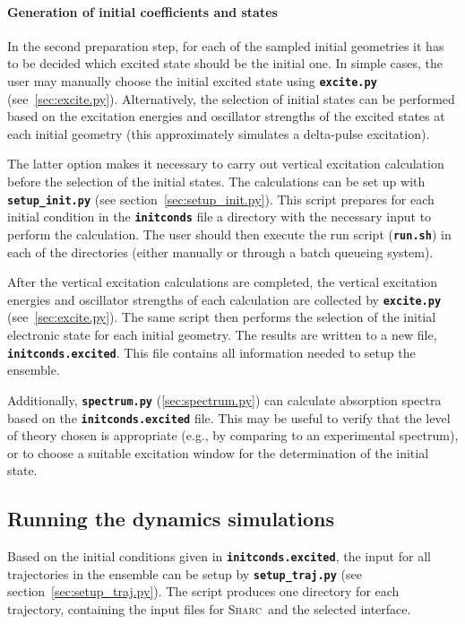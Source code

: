 \documentclass[a4paper,11pt,DIV=15,openany,twoside=false]{scrbook}
\newcommand{\sharc}{\textsc{Sharc}}
\newcommand{\ttt}[1]{\textbf{\texttt{#1}}}
\begin{document}
\paragraph{Generation of initial coefficients and states}

In the second preparation step, for each of the sampled initial geometries it has to be decided which excited state should be the initial one. In simple cases, the user may manually choose the initial excited state using \ttt{excite.py} (see~\ref{sec:excite.py}). Alternatively, the selection of initial states can be performed based on the excitation energies and oscillator strengths of the excited states at each initial geometry (this approximately simulates a delta-pulse excitation). 

The latter option makes it necessary to carry out vertical excitation calculation before the selection of the initial states.
The calculations can be set up with \ttt{setup\_init.py} (see section~\ref{sec:setup_init.py}). This script prepares for each initial condition in the \ttt{initconds} file a directory with the necessary input to perform the calculation. The user should then execute the run script (\ttt{run.sh}) in each of the directories (either manually or through a batch queueing system).

After the vertical excitation calculations are completed, the vertical excitation energies and oscillator strengths of each calculation are collected by \ttt{excite.py} (see~\ref{sec:excite.py}). The same script then performs the selection of the initial electronic state for each initial geometry. The results are written to a new file, \ttt{initconds.excited}. This file contains all information needed to setup the ensemble. 

Additionally, \ttt{spectrum.py} (\ref{sec:spectrum.py}) can calculate absorption spectra based on the \ttt{initconds.excited} file. This may be useful to verify that the level of theory chosen is appropriate (e.g., by comparing to an experimental spectrum), or to choose a suitable excitation window for the determination of the initial state.

\subsection{Running the dynamics simulations}

Based on the initial conditions given in \ttt{initconds.excited}, the input for all trajectories in the ensemble can be setup by \ttt{setup\_traj.py} (see section~\ref{sec:setup_traj.py}). The script produces one directory for each trajectory, containing the input files for \sharc\ and the selected interface.
\end{document}
